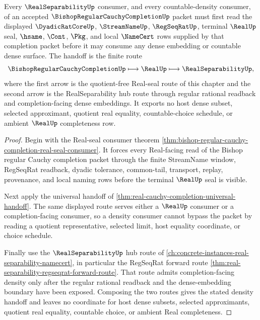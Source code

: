 \begin{theorem}
\label{thm:bishop-regular-cauchy-completion-density-handoff}
Every $\RealSeparabilityUp$ consumer, and every countable-density consumer, of an accepted $\BishopRegularCauchyCompletionUp$ packet must first read the displayed $\DyadicRatCoreUp$, $\StreamNameUp$, $\RegSeqRatUp$, terminal $\RealUp$ seal, $\hsame$, $\Cont$, $\Pkg$, and local $\NameCert$ rows supplied by that completion packet before it may consume any dense embedding or countable dense surface. The handoff is the finite route
$$
\BishopRegularCauchyCompletionUp \longmapsto
\RealUp \longmapsto \RealSeparabilityUp ,
$$
where the first arrow is the quotient-free Real-seal route of this chapter and the second arrow is the RealSeparability hub route through regular rational readback and completion-facing dense embeddings. It exports no host dense subset, selected approximant, quotient real equality, countable-choice schedule, or ambient $\RealUp$ completeness row.
\end{theorem}
\begin{proof}
Begin with the Real-seal consumer theorem \autoref{thm:bishop-regular-cauchy-completion-real-seal-consumer}. It forces every Real-facing read of the Bishop regular Cauchy completion packet through the finite StreamName window, RegSeqRat readback, dyadic tolerance, common-tail, transport, replay, provenance, and local naming rows before the terminal $\RealUp$ seal is visible.

Next apply the universal handoff of \autoref{thm:real-cauchy-completion-universal-handoff}. The same displayed route serves either a $\RealUp$ consumer or a completion-facing consumer, so a density consumer cannot bypass the packet by reading a quotient representative, selected limit, host equality coordinate, or choice schedule.

Finally use the $\RealSeparabilityUp$ hub route of \autoref{ch:concrete-instances-real-separability-namecert}, in particular the RegSeqRat forward route \autoref{thm:real-separability-regseqrat-forward-route}. That route admits completion-facing density only after the regular rational readback and the dense-embedding boundary have been exposed. Composing the two routes gives the stated density handoff and leaves no coordinate for host dense subsets, selected approximants, quotient real equality, countable choice, or ambient Real completeness.
\end{proof}

